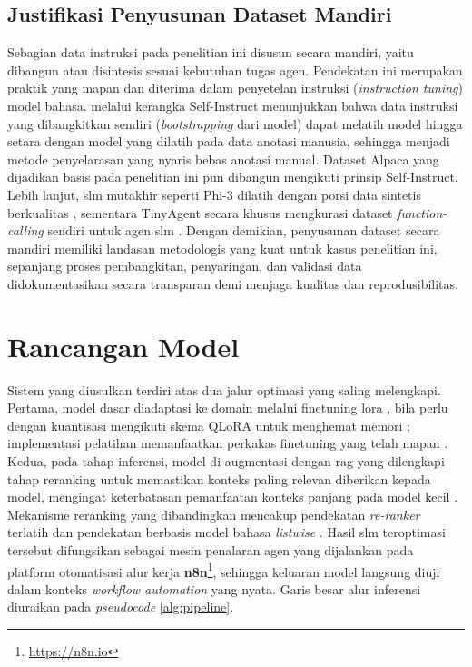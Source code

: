 \subsection{Justifikasi Penyusunan Dataset Mandiri}
Sebagian data instruksi pada penelitian ini disusun secara mandiri, yaitu dibangun atau disintesis sesuai kebutuhan tugas agen. Pendekatan ini merupakan praktik yang mapan dan diterima dalam penyetelan instruksi (\textit{instruction tuning}) model bahasa. \citet{wang2023selfinstruct} melalui kerangka Self-Instruct menunjukkan bahwa data instruksi yang dibangkitkan sendiri (\textit{bootstrapping} dari model) dapat melatih model hingga setara dengan model yang dilatih pada data anotasi manusia, sehingga menjadi metode penyelarasan yang nyaris bebas anotasi manual. Dataset Alpaca yang dijadikan basis pada penelitian ini pun dibangun mengikuti prinsip Self-Instruct. Lebih lanjut, \gls{slm} mutakhir seperti Phi-3 dilatih dengan porsi data sintetis berkualitas \citep{abdin2024phi3}, sementara TinyAgent secara khusus mengkurasi dataset \textit{function-calling} sendiri untuk agen \gls{slm} \citep{erdogan2024tinyagent}. Dengan demikian, penyusunan dataset secara mandiri memiliki landasan metodologis yang kuat untuk kasus penelitian ini, sepanjang proses pembangkitan, penyaringan, dan validasi data didokumentasikan secara transparan demi menjaga kualitas dan reprodusibilitas.

\section{Rancangan Model}
Sistem yang diusulkan terdiri atas dua jalur optimasi yang saling melengkapi. Pertama, model dasar diadaptasi ke domain melalui \gls{finetuning} \gls{lora} \citep{hu2022lora}, bila perlu dengan kuantisasi mengikuti skema QLoRA untuk menghemat memori \citep{dettmers2023qlora}; implementasi pelatihan memanfaatkan perkakas \gls{finetuning} yang telah mapan \citep{zheng2024llamafactory}. Kedua, pada tahap inferensi, model di-augmentasi dengan \gls{rag} \citep{lewis2020rag, gao2023ragsurvey} yang dilengkapi tahap \gls{reranking} untuk memastikan konteks paling relevan diberikan kepada model, mengingat keterbatasan pemanfaatan konteks panjang pada model kecil \citep{liu2024lostmiddle}. Mekanisme \gls{reranking} yang dibandingkan mencakup pendekatan \textit{re-ranker} terlatih \citep{ren2021rocketqav2} dan pendekatan berbasis model bahasa \textit{listwise} \citep{sun2023rankgpt}. Hasil \gls{slm} teroptimasi tersebut difungsikan sebagai mesin penalaran agen yang dijalankan pada platform otomatisasi alur kerja \textbf{n8n}\footnote{\url{https://n8n.io}}, sehingga keluaran model langsung diuji dalam konteks \textit{workflow automation} yang nyata. Garis besar alur inferensi diuraikan pada \textit{pseudocode} \ref{alg:pipeline}.

